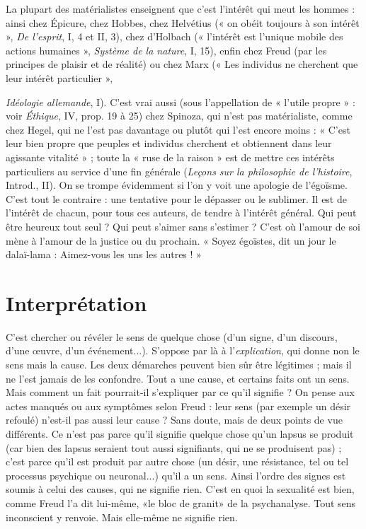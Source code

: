 La plupart des matérialistes enseignent que c’est l'intérêt qui meut les
hommes : ainsi chez Épicure, chez Hobbes, chez Helvétius (« on obéit toujours
à son intérêt », {\it De l'esprit}, I, 4 et II, 3), chez d’Holbach (« l'intérêt est l’unique
mobile des actions humaines », {\it Système de la nature}, I, 15), enfin chez Freud
(par les principes de plaisir et de réalité) ou chez Marx (« Les individus ne cherchent
que leur intérêt particulier », {{\it Idéologie allemande}, I). C’est vrai aussi (sous
l'appellation de « l’utile propre » : voir {\it Éthique}, IV, prop. 19 à 25) chez Spinoza,
qui n'est pas matérialiste, comme chez Hegel, qui ne l’est pas davantage
ou plutôt qui l’est encore moins : « C’est leur bien propre que peuples et individus
cherchent et obtiennent dans leur agissante vitalité » ; toute la « ruse de la
raison » est de mettre ces intérêts particuliers au service d’une fin générale
({\it Leçons sur la philosophie de l'histoire}, Introd., II). On se trompe évidemment si
l’on y voit une apologie de l’égoïsme. C’est tout le contraire : une tentative
pour le dépasser ou le sublimer. Il est de l'intérêt de chacun, pour tous ces
auteurs, de tendre à l'intérêt général. Qui peut être heureux tout seul ? Qui
peut s’aimer sans s’estimer ? C’est où l’amour de soi mène à l’amour de la justice
ou du prochain. « Soyez égoïstes, dit un jour le dalaï-lama : Aimez-vous les
uns les autres ! »

\section{Interprétation}
C'est chercher ou révéler le sens de quelque chose
(d’un signe, d’un discours, d’une œuvre, d’un événement...).
S'oppose par là à l'{\it explication}, qui donne non le sens mais la cause.
Les deux démarches peuvent bien sûr être légitimes ; mais il ne l’est jamais de
les confondre. Tout a une cause, et certains faits ont un sens. Mais comment
un fait pourrait-il s’expliquer par ce qu’il signifie ? On pense aux actes manqués
ou aux symptômes selon Freud : leur sens (par exemple un désir refoulé) n’est-il
pas aussi leur cause ? Sans doute, mais de deux points de vue différents. Ce
n’est pas parce qu’il signifie quelque chose qu’un lapsus se produit (car bien des
lapsus seraient tout aussi signifiants, qui ne se produisent pas) ; c’est parce qu’il
est produit par autre chose (un désir, une résistance, tel ou tel processus psychique
ou neuronal...) qu’il a un sens. Ainsi l’ordre des signes est soumis à
celui des causes, qui ne signifie rien. C’est en quoi la sexualité est bien, comme
Freud l’a dit lui-même, «le bloc de granit» de la psychanalyse. Tout sens
inconscient y renvoie. Mais elle-même ne signifie rien.

}
